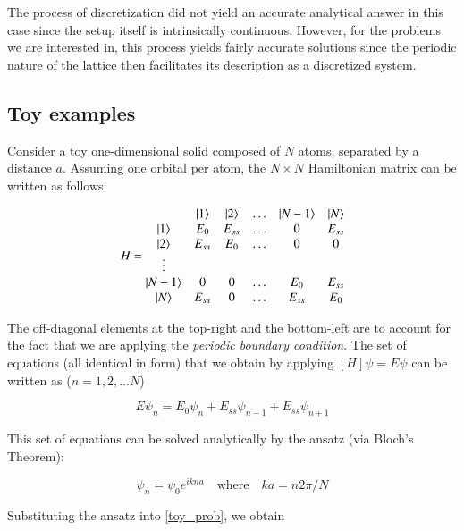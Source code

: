 \documentclass{resonance}
\begin{document}
The process of discretization did not yield an accurate analytical answer in this case since the setup itself is intrinsically continuous. However, for the problems we are interested in, this process yields fairly accurate solutions since the periodic nature of the lattice then facilitates its description as a discretized system. 

\subsection{Toy examples}

Consider a toy one-dimensional solid composed of $N$ atoms, separated by a distance $a$. Assuming one orbital per atom, the $N\times N$ Hamiltonian matrix can be written as follows:

\begin{equation}
H =
\begin{matrix}
     & \ket{1} & \ket{2} & \ldots & \ket{N-1} & \ket{N} \\
    \ket{1} & E_0 & E_{ss} & \ldots & 0 & E_{ss} \\
    \ket{2} & E_{ss} & E_0 & \ldots & 0 & 0 \\
    \vdots  &  &  &  &  &  \\
    \ket{N-1} & 0 & 0 & \ldots & E_0 & E_{ss} \\
    \ket{N} & E_{ss} & 0 & \ldots & E_{ss} & E_0 \\
\end{matrix}   
\end{equation}

The off-diagonal elements at the top-right and the bottom-left are to account for the fact that we are applying the \textit{periodic boundary condition}. The set of equations (all identical in form) that we obtain by applying $[H]\psi = E\psi$ can be written as ($n = 1, 2,\ldots N$)

\begin{equation*} \label{toy_prob}
    E\psi_{n} = E_0\psi_{n} + E_{ss}\psi_{n-1} + E_{ss}\psi_{n+1}
\end{equation*}

This set of equations can be solved analytically by the ansatz (via Bloch's Theorem):

\begin{equation} 
    \psi_{n} = \psi_0 e^{ikna} \quad \text{where} \quad ka = n2\pi/N
\end{equation}

Substituting the ansatz into \ref{toy_prob}, we obtain
\end{document}
